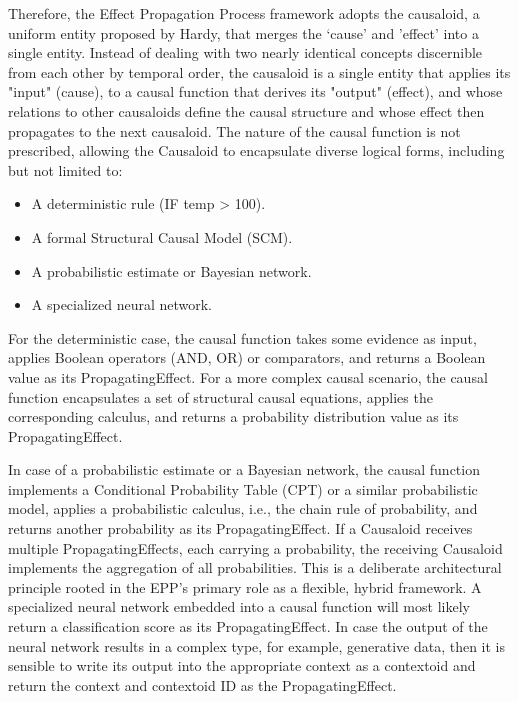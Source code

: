 Therefore, the Effect Propagation Process framework adopts the causaloid, a uniform entity proposed by Hardy\cite{HardyDynamicCausalStructure}, that merges the ‘cause' and 'effect' into a single entity. Instead of dealing with two nearly identical concepts discernible from each other by temporal order, the causaloid is a single entity that applies its "input" (cause), to a causal function that derives its "output" (effect), and whose relations to other causaloids define the causal structure and whose effect then propagates to the next causaloid. The nature of the causal function is not prescribed, allowing the Causaloid to encapsulate diverse logical forms, including but not limited to:

\begin{itemize}
	\item A deterministic rule (IF temp > 100).
 	\item A formal Structural Causal Model (SCM).
	\item A probabilistic estimate or Bayesian network.
	\item A specialized neural network.
\end{itemize}

For the deterministic case, the causal function takes some evidence as input, applies Boolean operators (AND, OR) or comparators, and returns a Boolean value as its PropagatingEffect. For a more complex causal scenario, the causal function encapsulates a set of structural causal equations,
applies the corresponding calculus, and returns a probability distribution value as its PropagatingEffect.

In case of a probabilistic estimate or a Bayesian network, the causal function implements a Conditional Probability Table (CPT) or a similar probabilistic model, applies a probabilistic calculus, i.e., the chain rule of probability, and returns another probability as its PropagatingEffect. If a Causaloid receives multiple PropagatingEffects, each carrying a probability, the receiving Causaloid implements the aggregation of all probabilities. This is a deliberate architectural principle rooted in the EPP's primary role as a flexible, hybrid framework. A specialized neural network embedded into a causal function will most likely return a classification score as its PropagatingEffect. In case the output of the neural network results in a complex type, for example, generative data, then it is sensible to write its output into the appropriate context as a contextoid and return the context and contextoid ID as the PropagatingEffect. 


